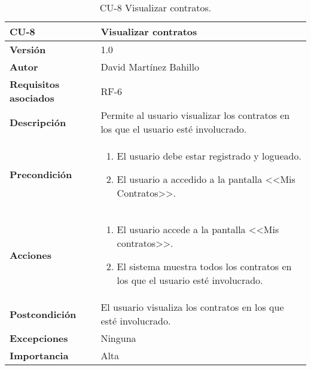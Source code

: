 \begin{table}[p]
	\centering
	\begin{tabularx}{\linewidth}{ p{} p{} }
		\toprule
		\textbf{CU-8}    & \textbf{Visualizar contratos}\\
		\midrule
		\textbf{Versión}              & 1.0    \\
		\textbf{Autor}                & David Martínez Bahillo \\
		\textbf{Requisitos asociados} & RF-6 \\
		\textbf{Descripción}          & Permite al usuario visualizar los contratos en los que el usuario esté involucrado. \\
		\textbf{Precondición}         &  
		\begin{enumerate}
			\def\labelenumi{\arabic{enumi}.}
			\tightlist
			\item El usuario debe estar registrado y logueado.
			\item El usuario a accedido a la pantalla <<Mis Contratos>>.
		\end{enumerate}\\
		\textbf{Acciones}             &
		\begin{enumerate}
			\def\labelenumi{\arabic{enumi}.}
			\tightlist
			\item El usuario accede a la pantalla <<Mis contratos>>.
			\item El sistema muestra todos los contratos en los que el usuario esté involucrado.
		\end{enumerate}\\
		\textbf{Postcondición}        & El usuario visualiza los contratos en los que esté involucrado. \\
		\textbf{Excepciones}          & Ninguna \\
		\textbf{Importancia}          & Alta \\
		\bottomrule
	\end{tabularx}
	\caption{CU-8 Visualizar contratos.}
\end{table}


